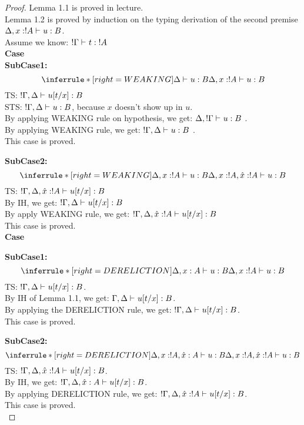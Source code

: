 \documentclass[titlepage]{article}
\begin{document}
\begin{proof}
Lemma 1.1 is proved in lecture.\\
Lemma 1.2 is proved by induction on the typing derivation of the second premise  $\Delta, x: ! A \mathrel{\vdash_{}^{} {u} : {B}}$. \\
   Assume we know: $! \Gamma \mathrel{\vdash_{}^{} {t} : {! A}}$ \\
   
  \noindent \textbf{Case}\\
  \noindent \textbf{SubCase1:}
  \[
   \inferrule*[ right = WEAKING]
   {\Delta \jtype{}{}{u}{B}}
   {\Delta, x:!A \jtype{}{}{u}{B}}
  \]
  TS: $! \Gamma, \Delta \mathrel{\vdash_{}^{} {u[t/x]} : {B}}$ \\
  STS: $! \Gamma, \Delta \mathrel{\vdash_{}^{} {u} : {B}}$, because $x$ doesn't show up in $u$. \\
  By applying WEAKING rule on hypothesis, we get: $\Delta, ! \Gamma \mathrel{\vdash_{}^{} {u} : {B}}$ .\\
  By applying WEAKING rule, we get: $! \Gamma, \Delta \mathrel{\vdash_{}^{} {u} : {B}}$ .\\
  This case is proved.

  \noindent \textbf{SubCase2:}
  \[
   \inferrule*[ right = WEAKING]
   {\Delta, x:!A \jtype{}{}{u}{B}}
   {\Delta, x:!A, \hat{x} : ! A \jtype{}{}{u}{B}}
  \]
  TS: $! \Gamma, \Delta, \hat{x} : !A \mathrel{\vdash_{}^{} {u[t/x]} : {B}}$ \\
  By IH, we get:
  $! \Gamma, \Delta \mathrel{\vdash_{}^{} {u[t/x]} : {B}}$\\
  By apply WEAKING rule, we get:
  $! \Gamma, \Delta, \hat{x} : ! A  \mathrel{\vdash_{}^{} {u[t/x]} : {B}}$\\
  This case is proved.\\

  \noindent \textbf{Case}

  \noindent \textbf{SubCase1:}
  \[
   \inferrule*[ right = DERELICTION ]
   {\Delta, x:A \jtype{}{}{u}{B}}
   {\Delta, x:!A \jtype{}{}{u}{B}}
  \]
  TS: $! \Gamma, \Delta \mathrel{\vdash_{}^{} {u[t/x]} : {B}}$. \\
  By IH of Lemma 1.1, we get:
  $ \Gamma, \Delta \mathrel{\vdash_{}^{} {u[t/x]} : {B}}$.\\
  By applying the DERELICTION rule, we get: 
  $ !\Gamma, \Delta \mathrel{\vdash_{}^{} {u[t/x]} : {B}}$. \\
  This case is proved.

  \noindent \textbf{SubCase2:}
  \[
   \inferrule*[ right = DERELICTION ]
   {\Delta, x:!A , \hat{x} : A\jtype{}{}{u}{B}}
   {\Delta, x:!A, \hat{x} : ! A \jtype{}{}{u}{B}}
  \]
  TS: $! \Gamma, \Delta, \hat{x} : ! A \mathrel{\vdash_{}^{} {u[t/x]} : {B}}$. \\
  By IH, we get: $! \Gamma, \Delta, \hat{x} : A \mathrel{\vdash_{}^{} {u[t/x]} : {B}}$. \\
  By applying DERELICTION rule, we get: $! \Gamma, \Delta, \hat{x} : ! A \mathrel{\vdash_{}^{} {u[t/x]} : {B}}$. \\
  This case is proved.\\


\end{proof}
\end{document}
